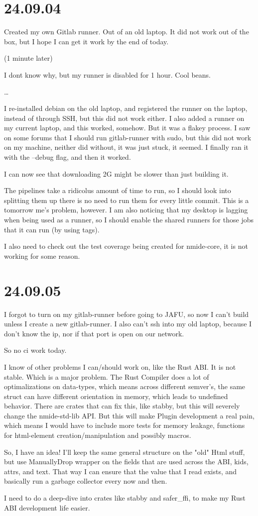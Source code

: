 \section{24.09.04}

Created my own Gitlab runner. Out of an old laptop. It did not work out of the box, but I hope
I can get it work by the end of today.

(1 minute later)

I dont know why, but my runner is disabled for 1 hour. Cool beans.

\dots

I re-installed debian on the old laptop, and registered the runner on the laptop, instead of
through SSH, but this did not work either. I also added a runner on my current laptop, and
this worked, somehow. But it was a flakey process. I saw on some forums that I should run
gitlab-runner with sudo, but this did not work on my machine, neither did without, it was
just stuck, it seemed. I finally ran it with the --debug flag, and then it worked.

I can now see that downloading 2G might be slower than just building it.

The pipelines take a ridicolus amount of time to run, so I should look into splitting them up
there is no need to run them for every little commit. This is a tomorrow me's problem, however.
I am also noticing that my desktop is lagging when being used as a runner, so I should enable
the shared runners for those jobs that it can run (by using tags).

I also need to check out the test coverage being created for nmide-core, it is not working for
some reason.


\section{24.09.05}

I forgot to turn on my gitlab-runner before going to JAFU, so now I can't build unless I create
a new gitlab-runner. I also can't ssh into my old laptop, because I don't know the ip, nor if
that port is open on our network.

So no ci work today.

I know of other problems I can/should work on, like the Rust ABI. It is not stable. Which is a
major problem. The Rust Compiler does a lot of optimalizations on data-types, which means across
different semver's, the same struct can have different orientation in memory, which leads to
undefined behavior. There are crates that can fix this, like stabby, but this will severely change
the nmide-std-lib API. But this will make Plugin development a real pain, which means I would have
to include more tests for memory leakage, functions for html-element creation/manipulation and
possibly macros.

So, I have an idea! I'll keep the same general structure on the "old" Html stuff, but use
ManuallyDrop wrapper on the fields that are used across the ABI, kids, attrs, and text. That way I
can ensure that the value that I read exists, and basically run a garbage collector every now and
then.

I need to do a deep-dive into crates like stabby and safer_ffi, to make my Rust ABI development life
easier.
